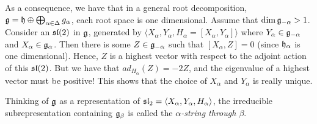 
 \begin{remark}
   As a consequence, we have that in a general root decomposition, $\g=\h\oplus
   \bigoplus_{\alpha\in \Delta} g_\alpha$, each root space is one dimensional. Assume
   that $\dim\g_{-\alpha} >1$. Consider an $\sl(2)$ in $\g$, generated by $\langle
   X_\alpha, Y_\alpha, H_\alpha=[X_\alpha,Y_\alpha]\rangle$ where
   $Y_\alpha\in\g_{-\alpha}$ and $X_\alpha\in\g_\alpha$. Then there is some $Z\in
   \g_{-\alpha}$ such that $[X_\alpha, Z]=0$ (since $\h_\alpha$ is one dimensional).
   Hence, $Z$ is a highest vector with respect to the adjoint action of this $\sl(2)$.
   But we have that $ad_{H_\alpha}(Z) = -2Z$, and the eigenvalue of a highest vector
   must be positive! This shows that the choice of $X_\alpha$ and $Y_\alpha$ is really
   unique.
 \end{remark}
 \begin{definition}
   Thinking of $\g$ as a representation of $\sl_2=\langle
   X_\alpha,Y_\alpha,H_\alpha\rangle$, the irreducible subrepresentation containing
   $\g_\beta$ is called the \emph{$\alpha$-string through
   $\beta$}.
 \end{definition}

